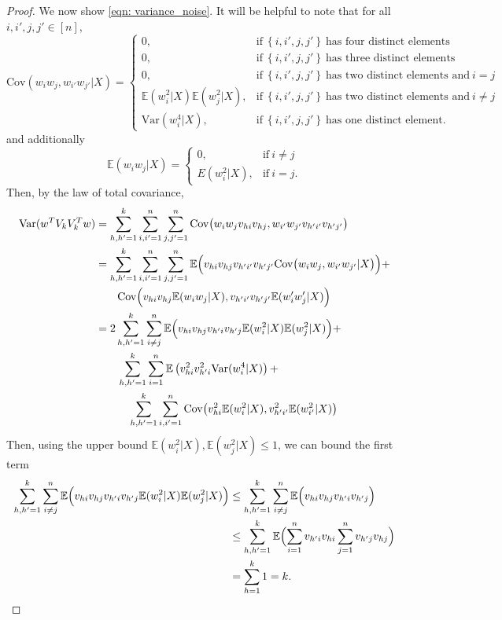 \documentclass{article}
\newcommand{\set}[1]{\left\{#1\right\}}
\newcommand{\Var}{\mathrm{Var}}
\newcommand{\1}{\mathbb{I}}
\newcommand{\Ebb}{\mathbb{E}}
\theoremstyle{alden}
\theoremstyle{aldenthm}
\theoremstyle{definition}
\theoremstyle{remark}
\begin{document}
\begin{proof}
	We now show \eqref{eqn: variance_noise}. It will be helpful to note that for all $i,i',j,j' \in [n]$,
	\begin{equation*}
	\mathrm{Cov}(w_iw_j, w_{i'}w_{j'} | X) = 
	\begin{cases}
	0, & \text{if}~ \set{i,i',j,j'}~ \textrm{has four distinct elements} \\
	0, & \text{if}~ \set{i,i',j,j'}~ \textrm{has three distinct elements} \\
	0, & \text{if}~ \set{i,i',j,j'}~ \textrm{has two distinct elements and}~ i = j \\
	\Ebb(w_i^2|X) \Ebb(w_j^2|X), & \text{if}~ \set{i,i',j,j'}~ \textrm{has two distinct elements and}~ i \neq j \\
	\Var(w_i^4|X), & \text{if}~ \set{i,i',j,j'}~ \textrm{has one distinct element.}
	\end{cases}
	\end{equation*}
	and additionally
	\begin{equation*}
	\Ebb(w_iw_j|X) =
	\begin{cases}
	0, & \text{if}~ i \neq j \\
	E(w_i^2|X), & \text{if}~ i = j.
	\end{cases}
	\end{equation*}
	Then, by the law of total covariance,
	\begin{align*}
	\mathrm{Var}(w^T V_k V_k^T w) & = \sum_{h,h' = 1}^{k} \sum_{i,i' = 1}^{n} \sum_{j,j' = 1}^{n} \mathrm{Cov} \bigl(w_iw_jv_{hi} v_{hj}, w_{i'}w_{j'}v_{h'i'} v_{h'j'}\bigr) \\
	& = \sum_{h,h' = 1}^{k} \sum_{i,i' = 1}^{n} \sum_{j,j' = 1}^{n} \Ebb \Bigl(  v_{hi} v_{hj} v_{h'i'} v_{h'j'} \mathrm{Cov} \bigl(w_iw_j, w_{i'}w_{j'} |X\bigr)\Bigr) + \\
	& \quad \quad \mathrm{Cov} \Bigl( v_{hi}v_{hj} \Ebb(w_iw_j|X), v_{h'i'}v_{h'j'} \Ebb(w_i'w_j'|X)  \Bigr) \\
	& = 2 \sum_{h,h' = 1}^{k} \sum_{i \neq j}^{n} \Ebb\Bigl( v_{hi} v_{hj} v_{h'i} v_{h'j} \Ebb(w_i^2|X) \Ebb(w_j^2|X) \Bigr) + \\
	& \quad \quad \sum_{h,h' = 1}^{k} \sum_{i = 1}^{n} \Ebb \left(v_{hi}^2 v_{h'i}^2 \Var(w_i^4|X)\right) +  \\
	& \quad \quad \quad \sum_{h,h' = 1}^{k} \sum_{i,i' = 1}^{n} \mathrm{Cov} \bigl( v_{hi} ^2 \Ebb(w_i^2|X), v_{h'i'}^2 \Ebb(w_{i'}^2|X)\bigr)
	\end{align*}
	Then, using the upper bound $\Ebb(w_i^2|X),\Ebb(w_j^2|X) \leq 1$, we can bound the first term
	\begin{align*}
	\sum_{h,h' = 1}^{k} \sum_{i \neq j}^{n} \Ebb\Bigl( v_{hi} v_{hj} v_{h'i} v_{h'j} \Ebb(w_i^2|X) \Ebb(w_j^2|X) \Bigr) & \leq \sum_{h,h' = 1}^{k} \sum_{i \neq j}^{n} \Ebb\Bigl( v_{hi} v_{hj} v_{h'i} v_{h'j} \Bigr) \\
	& \leq \sum_{h,h' = 1}^{k} \Ebb\Bigl( \sum_{i = 1}^{n}v_{h'i} v_{hi} \sum_{j = 1}^{n} v_{h'j} v_{hj} \Bigr) \\
	& = \sum_{h = 1}^{k} 1 = k.
	\end{align*}
	

\end{proof}
\end{document}
